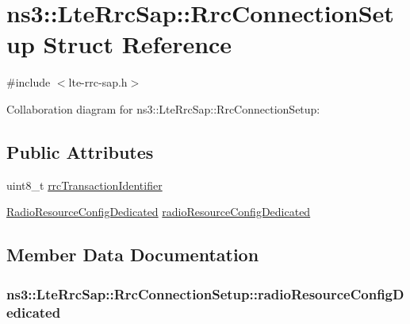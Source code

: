 \hypertarget{structns3_1_1LteRrcSap_1_1RrcConnectionSetup}{}\section{ns3\+:\+:Lte\+Rrc\+Sap\+:\+:Rrc\+Connection\+Setup Struct Reference}
\label{structns3_1_1LteRrcSap_1_1RrcConnectionSetup}


{\ttfamily \#include $<$lte-\/rrc-\/sap.\+h$>$}



Collaboration diagram for ns3\+:\+:Lte\+Rrc\+Sap\+:\+:Rrc\+Connection\+Setup\+:
\subsection*{Public Attributes}
\begin{DoxyCompactItemize}
\item 
uint8\+\_\+t \hyperlink{structns3_1_1LteRrcSap_1_1RrcConnectionSetup_a40e8a5a2d7f65d0fed6f4950ea9781c2}{rrc\+Transaction\+Identifier}
\item 
\hyperlink{structns3_1_1LteRrcSap_1_1RadioResourceConfigDedicated}{Radio\+Resource\+Config\+Dedicated} \hyperlink{structns3_1_1LteRrcSap_1_1RrcConnectionSetup_a6ef4a38c3ecafdb970726ac8b63393a1}{radio\+Resource\+Config\+Dedicated}
\end{DoxyCompactItemize}


\subsection{Member Data Documentation}
\subsubsection[{\texorpdfstring{radio\+Resource\+Config\+Dedicated}{radioResourceConfigDedicated}}]{ ns3\+::\+Lte\+Rrc\+Sap\+::\+Rrc\+Connection\+Setup\+::radio\+Resource\+Config\+Dedicated}\hypertarget{structns3_1_1LteRrcSap_1_1RrcConnectionSetup_a6ef4a38c3ecafdb970726ac8b63393a1}{}\label{structns3_1_1LteRrcSap_1_1RrcConnectionSetup_a6ef4a38c3ecafdb970726ac8b63393a1}
